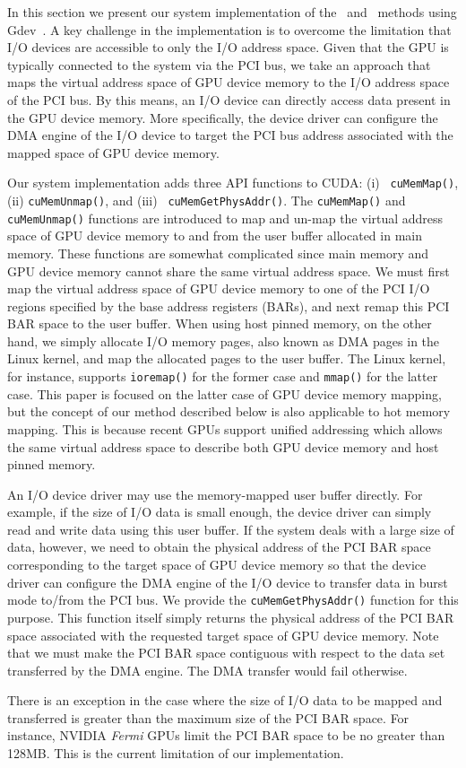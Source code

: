 In this section we present our system implementation of the \dm\ and \dmh\ 
methods using Gdev~\cite{Kato:Gdev:USENIX.ATC.2012}.
A key challenge in the implementation is to overcome the limitation that
I/O devices are accessible to only the I/O address space.
Given that the GPU is typically connected to the system via the PCI bus,
we take an approach that maps the virtual address space of GPU
device memory to the I/O address space of the PCI bus.
By this means, an I/O device can directly access data present in the GPU device memory.
More specifically, the device driver can configure the DMA engine of the
I/O device to target the PCI bus address associated with the mapped
space of GPU device memory.

Our system implementation adds three API functions to CUDA: (i) {\tt
cuMemMap()}, (ii) {\tt cuMemUnmap()}, and (iii) {\tt
cuMemGetPhysAddr()}.
The {\tt cuMemMap()} and {\tt cuMemUnmap()} functions are introduced to
map and un-map the virtual address space of GPU device memory to and
from the user buffer allocated in main memory.
These functions are somewhat complicated since main memory and GPU
device memory cannot share the same virtual address space.
We must first map the virtual address space of GPU device memory to one
of the PCI I/O regions specified by the base address registers (BARs),
and next remap this PCI BAR space to the user buffer.
When using host pinned memory, on the other hand, we simply allocate I/O
memory pages, also known as DMA pages in the Linux kernel, and map the
allocated pages to the user buffer.
The Linux kernel, for instance, supports {\tt ioremap()} for the former
case and {\tt mmap()} for the latter case.
This paper is focused on the latter case of GPU device memory mapping,
but the concept of our method described below is also applicable to hot
memory mapping.
This is because recent GPUs support unified addressing which allows the
same virtual address space to describe both GPU device memory and host
pinned memory.

An I/O device driver may use the memory-mapped user buffer directly.
For example, if the size of I/O data is small enough, the device driver
can simply read and write data using this user buffer.
If the system deals with a large size of data, however, we need to
obtain the physical address of the PCI BAR space corresponding to the
target space of GPU device memory so that the device driver can
configure the DMA engine of the I/O device to transfer data in burst
mode to/from the PCI bus.
We provide the {\tt cuMemGetPhysAddr()} function for this purpose.
This function itself simply returns the physical address of the PCI BAR
space associated with the requested target space of GPU device memory.
Note that we must make the PCI BAR space contiguous with respect to the
data set transferred by the DMA engine.
The DMA transfer would fail otherwise.

There is an exception in the case where the size of I/O data to be mapped and
transferred is greater than the maximum size of the PCI BAR space.
For instance, NVIDIA \emph{Fermi} GPUs limit the PCI BAR space to be no greater
than 128MB.
This is the current limitation of our implementation.
